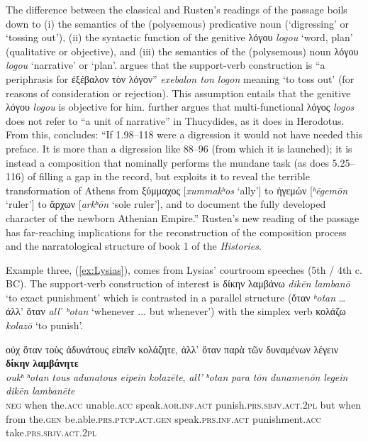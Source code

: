 \documentclass[output=paper,colorlinks,citecolor=brown]{langscibook}
\begin{document}
The difference between the classical and Rusten’s readings of the passage boils down to (i) the semantics of the (polysemous) predicative noun (‘digressing’ or ‘tossing out’), (ii) the syntactic function of the genitive λόγου \textit{logou} ‘word, plan' (qualitative or objective), and (iii) the semantics of the (polysemous) noun λόγου \textit{logou} ‘narrative' or ‘plan'. \citet[233]{rustenTenEkvolenTou2020} argues that the support-verb construction is “a periphrasis for ἐξέβαλον τὸν λόγον” \textit{exebalon ton logon} meaning ‘to toss out’ (for reasons of consideration or rejection). This assumption entails that the genitive λόγου \textit{logou} is objective for him. \citet[234]{rustenTenEkvolenTou2020} further argues that multi-functional λόγος \textit{logos} does not refer to “a unit of narrative” in Thucydides, as it does in Herodotus. From this, \citet[251]{rustenTenEkvolenTou2020} concludes: “If 1.98–118 were a digression it would not have needed this preface. It is more than a digression like 88–96 (from which it is launched); it is instead a composition that nominally performs the mundane task (as does 5.25–116) of filling a gap in the record, but exploits it to reveal the terrible transformation of Athens from ξύμμαχος [\textit{xummakʰos} ‘ally’] to ἡγεμών [\textit{ʰēgemōn} ‘ruler’] to ἄρχων [\textit{arkʰōn} ‘sole ruler’], and to document the fully developed character of the newborn Athenian Empire.” Rusten’s new reading of the passage has far-reaching implications for the reconstruction of the composition process and the narratological structure of book 1 of the \textit{Histories}.
	
 
 Example three, (\ref{ex:Lysias}), comes from Lysias’ courtroom speeches (5th / 4th c. BC). The support-verb construction of interest is δίκην λαμβάνω \textit{dikēn lambanō} ‘to exact punishment' which is contrasted in a parallel structure (ὅταν \textit{ʰotan} … ἀλλ’ ὅταν \textit{all᾽ ʰotan} ‘whenever ... but whenever') with the simplex verb κολάζω \textit{kolazō} ‘to punish'.


\ea\label{ex:Lysias}
\glll οὐχ ὅταν τοὺς ἀδυνάτους εἰπεῖν κολάζητε, ἀλλ’ ὅταν παρὰ τῶν δυναμένων λέγειν \textbf{δίκην} \textbf{λαμβάνητε} \\
\textit{oukʰ} \textit{ʰotan} \textit{tous} \textit{adunatous} \textit{eipein} \textit{kolazēte}, \textit{all’} \textit{ʰotan} \textit{para} \textit{tōn} \textit{dunamenōn} \textit{legein} \textit{dikēn} \textit{lambanēte} \\
    \textsc{neg} when the.\textsc{acc} unable.\textsc{acc} speak.\textsc{aor.inf.act} punish.\textsc{prs.sbjv.act.2pl} but when from the.\textsc{gen} be.able.\textsc{prs.ptcp.act.gen} speak.\textsc{prs.inf.act} punishment.\textsc{acc} take.\textsc{prs.sbjv.act.2pl} \\
\end{document}
